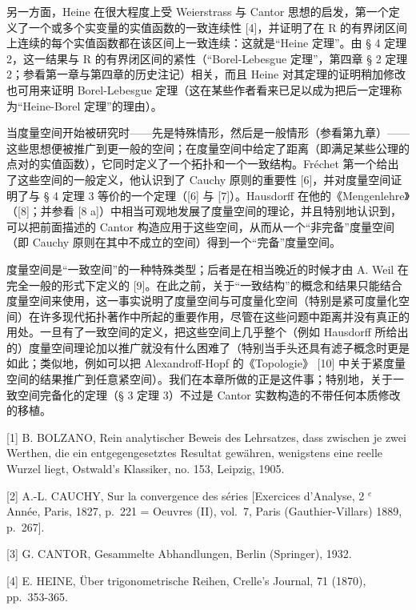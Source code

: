 另一方面，Heine 在很大程度上受 Weierstrass 与 Cantor 思想的启发，第一个定义了一个或多个实变量的实值函数的一致连续性 {[}4{]}，并证明了在 R 的有界闭区间上连续的每个实值函数都在该区间上一致连续：这就是“Heine 定理”。由 § 4 定理 2，这一结果与 R 的有界闭区间的紧性（“Borel-Lebesgue 定理”，第四章 § 2 定理 2；参看第一章与第四章的历史注记）相关，而且 Heine 对其定理的证明稍加修改也可用来证明 Borel-Lebesgue 定理（这在某些作者看来已足以成为把后一定理称为“Heine-Borel 定理”的理由）。

当度量空间开始被研究时——先是特殊情形，然后是一般情形（参看第九章）——这些思想便被推广到更一般的空间；在度量空间中给定了距离（即满足某些公理的点对的实值函数），它同时定义了一个拓扑和一个一致结构。Fréchet 第一个给出了这些空间的一般定义，他认识到了 Cauchy 原则的重要性 {[}6{]}，并对度量空间证明了与 § 4 定理 3 等价的一个定理（{[}6{]} 与 {[}7{]}）。Hausdorff 在他的《Mengenlehre》（{[}8{]}；并参看 {[}8 a{]}）中相当可观地发展了度量空间的理论，并且特别地认识到，可以把前面描述的 Cantor 构造应用于这些空间，从而从一个“非完备”度量空间（即 Cauchy 原则在其中不成立的空间）得到一个“完备”度量空间。

度量空间是“一致空间”的一种特殊类型；后者是在相当晚近的时候才由 A. Weil 在完全一般的形式下定义的 {[}9{]}。在此之前，关于“一致结构”的概念和结果只能结合度量空间来使用，这一事实说明了度量空间与可度量化空间（特别是紧可度量化空间）在许多现代拓扑著作中所起的重要作用，尽管在这些问题中距离并没有真正的用处。一旦有了一致空间的定义，把这些空间上几乎整个（例如 Hausdorff 所给出的）度量空间理论加以推广就没有什么困难了（特别当手头还具有滤子概念时更是如此；类似地，例如可以把 Alexandroff-Hopf 的《Topologie》 {[}10{]} 中关于紧度量空间的结果推广到任意紧空间）。我们在本章所做的正是这件事；特别地，关于一致空间完备化的定理（§ 3 定理 3）不过是 Cantor 实数构造的不带任何本质修改的移植。


{[}1{]} B. BOLZANO, Rein analytischer Beweis des Lehrsatzes, dass zwischen je zwei Werthen, die ein entgegengesetztes Resultat gewähren, wenigstens eine reelle Wurzel liegt, Ostwald's Klassiker, no. 153, Leipzig, 1905.

{[}2{]} A.-L. CAUCHY, Sur la convergence des séries {[}Exercices d'Analyse, 2 \(^{e}\) Année, Paris, 1827, p.~221 = Oeuvres (II), vol.~7, Paris (Gauthier-Villars) 1889, p.~267{]}.

{[}3{]} G. CANTOR, Gesammelte Abhandlungen, Berlin (Springer), 1932.

{[}4{]} E. HEINE, Über trigonometrische Reihen, Crelle's Journal, 71 (1870), pp.~353-365.

